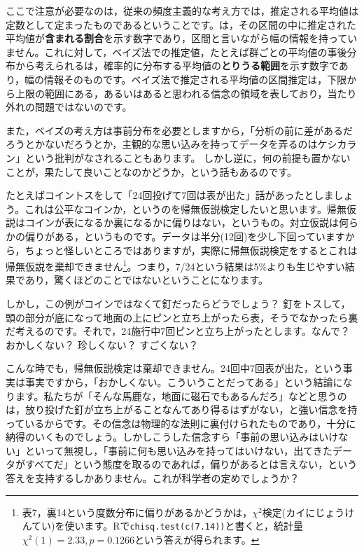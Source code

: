 \documentclass{ltjbook}
\begin{document}
ここで注意が必要なのは，従来の頻度主義的な考え方では，推定される平均値は定数として定まったものであるということです。は，その区間の中に推定された平均値が\textbf{含まれる割合}を示す数字であり，区間と言いながら幅の情報を持っていません。これに対して，ベイズ法での推定値，たとえば群ごとの平均値の事後分布から考えられるは，確率的に分布する平均値の\textbf{とりうる範囲}を示す数字であり，幅の情報そのものです。ベイズ法で推定される平均値の区間推定は，下限から上限の範囲にある，あるいはあると思われる信念の領域を表しており，当たり外れの問題ではないのです。

また，ベイズの考え方は事前分布を必要としますから，「分析の前に差があるだろうとかないだろうとか，主観的な思い込みを持ってデータを弄るのはケシカラン」という批判がなされることもあります。
しかし逆に，何の前提も置かないことが，果たして良いことなのかどうか，という話もあるのです\parencite{Maeda2017}。

たとえばコイントスをして「24回投げて7回は表が出た」話があったとしましょう。これは公平なコインか，というのを帰無仮説検定したいと思います。帰無仮説はコインが表になるか裏になるかに偏りはない，というもの。対立仮説は何らかの偏りがある，というものです。データは半分(12回)を少し下回っていますから，ちょっと怪しいところではありますが，実際に帰無仮説検定をするとこれは帰無仮説を棄却できません\footnote{表7，裏14という度数分布に偏りがあるかどうかは，$\chi^2$検定(カイにじょうけんてい)を使います。Rで\texttt{chisq.test(c(7.14))}と書くと，統計量$\chi^2(1)=2.33,p=0.1266$という答えが得られます。}。つまり，7/24という結果は5\%よりも生じやすい結果であり，驚くほどのことではないということになります。

しかし，この例がコインではなくて釘だったらどうでしょう？ 釘をトスして，頭の部分が底になって地面の上にピンと立ち上がったら表，そうでなかったら裏だ考えるのです。それで，24施行中7回ピンと立ち上がったとします。なんで？ おかしくない？ 珍しくない？ すごくない？

こんな時でも，帰無仮説検定は棄却できません。24回中7回表が出た，という事実は事実ですから，「おかしくない。こういうことだってある」という結論になります。私たちが「そんな馬鹿な，地面に磁石でもあるんだろ」などと思うのは，放り投げた釘が立ち上がることなんてあり得るはずがない，と強い信念を持っているからです。その信念は物理的な法則に裏付けられたものであり，十分に納得のいくものでしょう。しかしこうした信念すら「事前の思い込みはいけない」といって無視し，「事前に何も思い込みを持ってはいけない，出てきたデータがすべてだ」という態度を取るのであれば，偏りがあるとは言えない，という答えを支持するしかありません。これが科学者の定めでしょうか？
\end{document}
